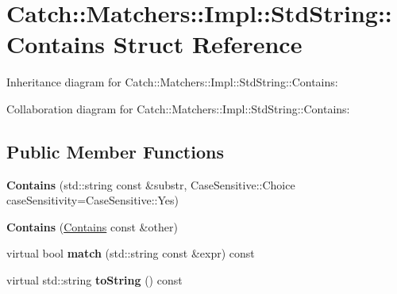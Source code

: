 \hypertarget{structCatch_1_1Matchers_1_1Impl_1_1StdString_1_1Contains}{}\section{Catch\+:\+:Matchers\+:\+:Impl\+:\+:Std\+String\+:\+:Contains Struct Reference}
\label{structCatch_1_1Matchers_1_1Impl_1_1StdString_1_1Contains}


Inheritance diagram for Catch\+:\+:Matchers\+:\+:Impl\+:\+:Std\+String\+:\+:Contains\+:


Collaboration diagram for Catch\+:\+:Matchers\+:\+:Impl\+:\+:Std\+String\+:\+:Contains\+:
\subsection*{Public Member Functions}
\begin{DoxyCompactItemize}
\item 
{\bfseries Contains} (std\+::string const \&substr, Case\+Sensitive\+::\+Choice case\+Sensitivity=Case\+Sensitive\+::\+Yes)\hypertarget{structCatch_1_1Matchers_1_1Impl_1_1StdString_1_1Contains_a7a062d83bd3e3075929dbb55e1c24258}{}\label{structCatch_1_1Matchers_1_1Impl_1_1StdString_1_1Contains_a7a062d83bd3e3075929dbb55e1c24258}

\item 
{\bfseries Contains} (\hyperlink{structCatch_1_1Matchers_1_1Impl_1_1StdString_1_1Contains}{Contains} const \&other)\hypertarget{structCatch_1_1Matchers_1_1Impl_1_1StdString_1_1Contains_ad6b1ef653dfcb3bab43c43be043dc4e8}{}\label{structCatch_1_1Matchers_1_1Impl_1_1StdString_1_1Contains_ad6b1ef653dfcb3bab43c43be043dc4e8}

\item 
virtual bool {\bfseries match} (std\+::string const \&expr) const \hypertarget{structCatch_1_1Matchers_1_1Impl_1_1StdString_1_1Contains_aa27d823dea5770025a24424fc3355a6f}{}\label{structCatch_1_1Matchers_1_1Impl_1_1StdString_1_1Contains_aa27d823dea5770025a24424fc3355a6f}

\item 
virtual std\+::string {\bfseries to\+String} () const \hypertarget{structCatch_1_1Matchers_1_1Impl_1_1StdString_1_1Contains_a226755351f3598179925f3ab89d6def7}{}\label{structCatch_1_1Matchers_1_1Impl_1_1StdString_1_1Contains_a226755351f3598179925f3ab89d6def7}

\end{DoxyCompactItemize}
